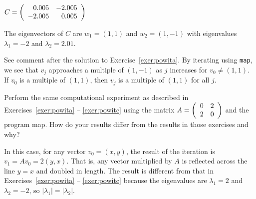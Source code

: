 \documentclass{ximera}
\begin{document}
\begin{exercise}  \label{exer:powitc}
$C=\left(\begin{array}{rr} 0.005 & -2.005\\ -2.005 &0.005\end{array}\right)$

\begin{solution}

\ans The eigenvectors of $C$ are $w_1 = (1,1)$ and $w_2 = (1,-1)$ with 
eigenvalues $\lambda_1 = -2$ and $\lambda_2 = 2.01$.  

\soln See comment after the solution to Exercise~\ref{exer:powita}.
By iterating using {\tt map}, we see that $v_j$ approaches a multiple
of $(1,-1)$ as $j$ increases for $v_0 \neq (1,1)$.  If $v_0$ is a
multiple of $(1,1)$, then $v_j$ is a multiple of $(1,1)$ for all $j$.

\end{solution}
\end{exercise}

\begin{exercise} \label{c7.7.3}
Perform the same computational experiment as described in
Exercises~\ref{exer:powita} -- \ref{exer:powitc} using the matrix
$A=\left(\begin{array}{rr} 0 & 2\\ 2 &0\end{array}\right)$
and the program {\sf map}.  How do your results differ from the results
in those exercises and why?

\begin{solution}

In this case, for any vector $v_0 = (x,y)$, the result of the iteration
is $v_1 = Av_0 = 2(y,x)$.  That is, any vector multiplied by $A$ is
reflected across the line $y = x$ and doubled in length.  The result
is different from that in Exercises~\ref{exer:powita} -- \ref{exer:powitc}
because the eigenvalues are $\lambda_1 = 2$ and $\lambda_2 = -2$, so
$|\lambda_1| = |\lambda_2|$.




\end{solution}
\end{exercise}
\end{document}

